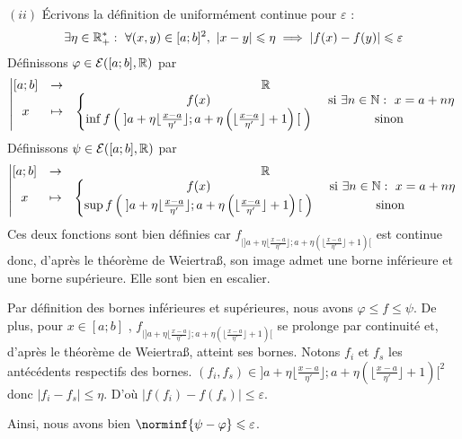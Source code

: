 \documentclass{article}
\begin{document}
\begin{question_kholle}
	$(ii)$ Écrivons la définition de uniformément continue pour $\varepsilon$ :
	\begin{equation*}
		\exists \eta \in \mathbb R_ +^* : \ \forall (x, y) \in [a;b]^2, \
		|x - y| \leqslant \eta \implies |f(x) - f(y)| \leqslant \varepsilon
	\end{equation*}
	Définissons $\varphi \in \mathcal{E}({[a;b]}, \mathbb R)$ par
	\begin{equation*}
		\left| \begin{matrix}
			[a;b] &\rightarrow& \mathbb R \\
			x &\mapsto& \left\{ \begin{matrix}
				f(x) &\text{ si } \exists n \in \mathbb N : \ x = a + n \eta \\
				\inf f\left( \; ]a + \eta \lfloor \frac{x-a}{\eta'} \rfloor; a + \eta \left( \lfloor \frac{x-a}{\eta'} \rfloor + 1 \right) [ \; \right) &\text{ sinon }
			\end{matrix} \right.
		\end{matrix} \right.
	\end{equation*}
	Définissons $\psi \in \mathcal{E}({[a;b]}, \mathbb R)$ par
	\begin{equation*}
		\left| \begin{matrix}
			[a;b] &\rightarrow& \mathbb R \\
			x &\mapsto& \left\{ \begin{matrix}
				f(x) &\text{ si } \exists n \in \mathbb N : \ x = a + n \eta \\
				\sup f\left( \; ] a + \eta \lfloor \frac{x-a}{\eta'} \rfloor; a + \eta \left( \lfloor \frac{x-a}{\eta'} \rfloor + 1\right)[ \; \right) &\text{ sinon }
			\end{matrix} \right.
		\end{matrix} \right.
	\end{equation*}
	Ces deux fonctions sont bien définies car $f_{|] a + \eta \lfloor \frac{x-a}{\eta'} \rfloor; a + \eta \left( \lfloor \frac{x-a}{\eta'} \rfloor + 1\right)[}$ est continue donc, d'après le théorème de Weiertraß, son image admet une borne inférieure et une borne supérieure.
	Elle sont bien en escalier.
	
	Par définition des bornes inférieures et supérieures, nous avons $\varphi \leqslant f \leqslant \psi$.
	De plus, pour $x \in [a;b]$ \fq, $f_{|] a + \eta \lfloor \frac{x-a}{\eta'} \rfloor; a + \eta \left( \lfloor \frac{x-a}{\eta'} \rfloor + 1\right)[}$ se prolonge par continuité et, d'après le théorème de Weiertraß, atteint ses bornes. Notons $f_i$ et $f_s$ les antécédents respectifs des bornes.
	$(f_i, f_s) \in ] a + \eta \lfloor \frac{x-a}{\eta'} \rfloor; a + \eta \left( \lfloor \frac{x-a}{\eta'} \rfloor + 1\right)[ ^2$ donc $\left|f_i - f_s\right| \leqslant \eta$.
	D'où $\left| f(f_i) - f(f_s) \right| \leqslant \varepsilon$.
	
	Ainsi, nous avons bien $\norminf{\psi - \varphi} \leqslant \varepsilon$.
\end{question_kholle}
\end{document}
